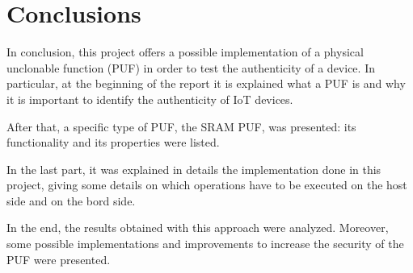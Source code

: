 \chapter{Conclusions}
In conclusion, this project offers a possible implementation of a physical unclonable function (PUF) in order to test the authenticity of a device.
In particular, at the beginning of the report it is explained what a PUF is and why it is important to identify the authenticity of IoT devices.

After that, a specific type of PUF, the SRAM PUF, was presented: its functionality and its properties were listed.

In the last part, it was explained in details the implementation done in this project, giving some details on which operations have to be executed on the host side and on the bord side.

In the end, the results obtained with this approach were analyzed. Moreover, some possible implementations and improvements to increase the security of the PUF were presented.
